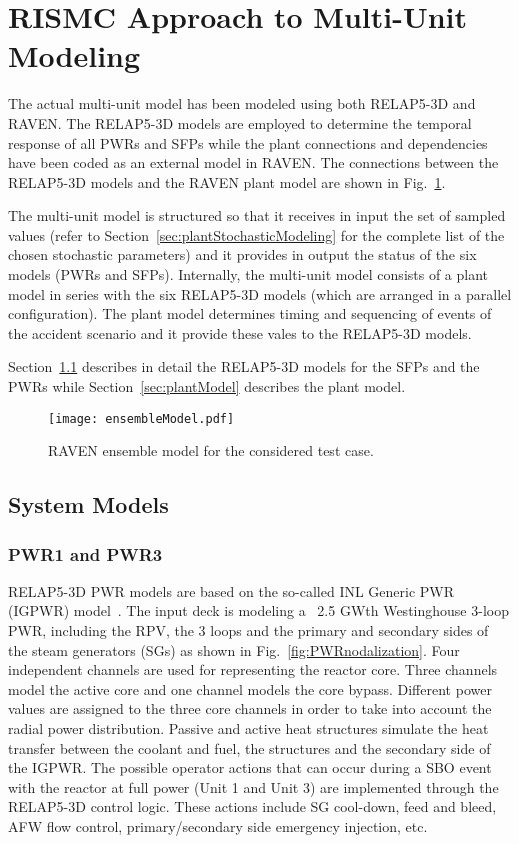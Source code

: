 \section{RISMC Approach to Multi-Unit Modeling}
\label{sec:RISMC_MU_modeling}

The actual multi-unit model has been modeled using both RELAP5-3D and RAVEN.
The RELAP5-3D models are employed to determine the temporal response of all PWRs and SFPs while the plant 
connections and dependencies have been coded as an external model in RAVEN.
The connections between the RELAP5-3D models and the RAVEN plant model are 
shown in Fig.~\ref{fig:ensembleModel}.

The multi-unit model is structured so that it receives in input the set of 
sampled values (refer to Section~\ref{sec:plantStochasticModeling} for the complete list of 
the chosen stochastic parameters) and it provides in output the status of the six
models (PWRs and SFPs).
Internally, the multi-unit model consists of a plant model in series with the six 
RELAP5-3D models (which are arranged in a parallel configuration).
The plant model determines timing and sequencing of events of the accident scenario
and it provide these vales to the RELAP5-3D models.

Section~\ref{sec:systemModels} describes in detail the RELAP5-3D models for 
the SFPs and the PWRs while Section~\ref{sec:plantModel} describes the plant 
model.
 
\begin{figure}
    \centering
    \texttt{[image: ensembleModel.pdf]}
    \caption{RAVEN ensemble model for the considered test case.}
    \label{fig:ensembleModel}
\end{figure}

\subsection{System Models}
\label{sec:systemModels}

\subsubsection{PWR1 and PWR3}
RELAP5-3D PWR models are based on the so-called INL Generic PWR (IGPWR) 
model~\cite{parisiExternalHazard,ronaldoRISMC}. 
The input deck is modeling a ~2.5 GWth Westinghouse 3-loop PWR, including the RPV,
the 3 loops and the primary and secondary sides of the steam 
generators (SGs) as shown in Fig.~\ref{fig:PWRnodalization}.
Four independent channels are used for representing the reactor core. Three channels model 
the active core and one channel models the core bypass. Different power values are assigned 
to the three core channels in order to take into account the radial power distribution. 
Passive and active heat structures simulate the heat transfer between the coolant and fuel, 
the structures and the secondary side of the IGPWR.
The possible operator actions that can occur during a SBO event with 
the reactor at full power (Unit 1 and Unit 3) are implemented through the RELAP5-3D control 
logic. These actions include SG cool-down, feed and bleed, AFW flow control, primary/secondary 
side emergency injection, etc.

